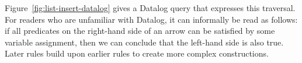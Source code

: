 \begin{figure*}
\begin{align*}

\end{align*}
\caption{Datalog rules for an ordered list (insertion only).}\label{fig:list-insert-datalog}
\end{figure*}

\begin{figure*}
\begin{align*}

\end{align*}
\caption{Datalog rules for assignment of map keys and list elements.}\label{fig:assignment-datalog}
\end{figure*}

Figure~\ref{fig:list-insert-datalog} gives a Datalog query that expresses this traversal.
For readers who are unfamiliar with Datalog, it can informally be read as follows: if all predicates on the right-hand side of an arrow can be satisfied by some variable assignment, then we can conclude that the left-hand side is also true.
Later rules build upon earlier rules to create more complex constructions.
